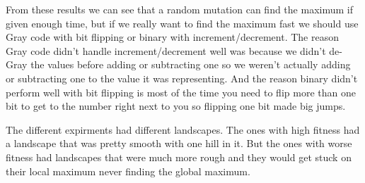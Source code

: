 \documentclass[12pt]{article}
\begin{document}
From these results we can see that a random mutation can find the maximum if given enough time, but if we really want to find the maximum fast we should use Gray code with bit flipping or binary with increment/decrement. The reason Gray code didn't handle increment/decrement well was because we didn't de-Gray the values before adding or subtracting one so we weren't actually adding or subtracting one to the value it was representing. And the reason binary didn't perform well with bit flipping is most of the time you need to flip more than one bit to get to the number right next to you so flipping one bit made big jumps.

The different expirments had different landscapes. The ones with high fitness had a landscape that was pretty smooth with one hill in it. But the ones with worse fitness had landscapes that were much more rough and they would get stuck on their local maximum never finding the global maximum.
\end{document}
